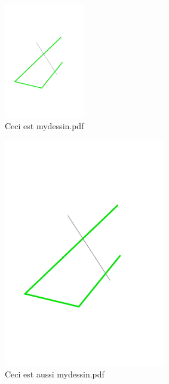 \documentclass[french]{article}
\begin{document}
\begin{figure}[!h]
\centering
\includegraphics[width=100pt]{mydessin.pdf}
\caption{Ceci est mydessin.pdf}
\label{mydessin1}
\end{figure}

\begin{figure}[!h]
\centering
\includegraphics[width=200pt]{mydessin.pdf}
\caption{Ceci est aussi mydessin.pdf}
\label{mydessin2}
\end{figure}
\end{document}

